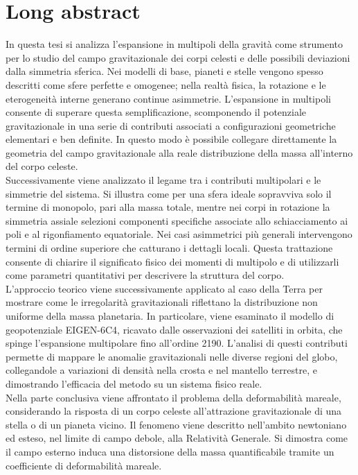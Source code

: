 \documentclass[10pt]{article}
\begin{document}
\section*{Long abstract}
In questa tesi si analizza l’espansione in multipoli della gravità come strumento per lo studio del campo gravitazionale dei corpi celesti e delle possibili deviazioni dalla simmetria sferica. Nei modelli di base, pianeti e stelle vengono spesso descritti come sfere perfette e omogenee; nella realtà fisica, la rotazione e le eterogeneità interne generano continue asimmetrie. L’espansione in multipoli consente di superare questa semplificazione, scomponendo il potenziale gravitazionale in una serie di contributi associati a configurazioni geometriche elementari e ben definite. In questo modo è possibile collegare direttamente la geometria del campo gravitazionale alla reale distribuzione della massa all’interno del corpo celeste. \\

Successivamente viene analizzato il legame tra i contributi multipolari e le simmetrie del sistema. Si illustra come per una sfera ideale sopravviva solo il termine di monopolo, pari alla massa totale, mentre nei corpi in rotazione la simmetria assiale selezioni componenti specifiche associate allo schiacciamento ai poli e al rigonfiamento equatoriale. Nei casi asimmetrici più generali intervengono termini di ordine superiore che catturano i dettagli locali. Questa trattazione consente di chiarire il significato fisico dei momenti di multipolo e di utilizzarli come parametri quantitativi per descrivere la struttura del corpo. \\

L’approccio teorico viene successivamente applicato al caso della Terra per mostrare come le irregolarità gravitazionali riflettano la distribuzione non uniforme della massa planetaria. In particolare, viene esaminato il modello di geopotenziale EIGEN-6C4, ricavato dalle osservazioni dei satelliti in orbita, che spinge l’espansione multipolare fino all'ordine 2190. L’analisi di questi contributi permette di mappare le anomalie gravitazionali nelle diverse regioni del globo, collegandole a variazioni di densità nella crosta e nel mantello terrestre, e dimostrando l'efficacia del metodo su un sistema fisico reale. \\

Nella parte conclusiva viene affrontato il problema della deformabilità mareale, considerando la risposta di un corpo celeste all’attrazione gravitazionale di una stella o di un pianeta vicino. Il fenomeno viene descritto nell'ambito newtoniano ed esteso, nel limite di campo debole, alla Relatività Generale. Si dimostra come il campo esterno induca una distorsione della massa quantificabile tramite un coefficiente di deformabilità mareale. \\
\end{document}
